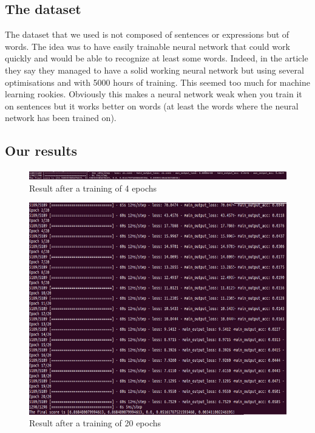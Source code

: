 \documentclass[12pt]{article}
\begin{document}
\subsection{The dataset}

The dataset that we used is not composed of sentences or expressions but of words. The idea was to have easily trainable neural network that could work quickly and would be able to recognize at least some words. Indeed, in the article they say they managed to have a solid working neural network but using several optimisations and with 5000 hours of training. This seemed too much for machine learning rookies. Obviously this makes a neural network weak when you train it on sentences but it works better on words (at least the words where the neural network has been trained on).

\subsection{Our results}

\begin{figure}[H]
  \begin{center}
    \includegraphics[scale=0.4]{images/image2.png}
    \caption{Result after a training of 4 epochs}
  \end{center}
\end{figure}

\begin{figure}[H]
  \begin{center}
    \includegraphics[scale=0.9]{images/image3.png}
    \caption{Result after a training of 20 epochs}
  \end{center}
\end{figure}
\end{document}
